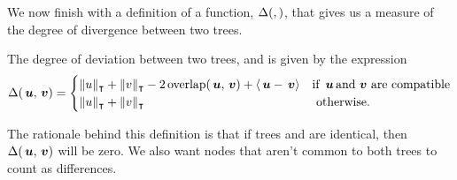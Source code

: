 \begin{definition}



\end{definition}


We now finish with a definition of a function, $\Delta(,)$, that gives us a
measure of the degree of divergence between two trees.
\begin{definition}
  \label{defdeviation}
  The degree of deviation between two trees,  and  is given  by the expression
  \begin{equation}
    \Delta(\,\boldsymbol{u},\,\boldsymbol{v}) = \begin{cases}
      \lVert{u}\rVert_{\intercal} + \lVert{v}\rVert_{\intercal} - 2\operatorname{overlap}(\,\boldsymbol{u},\,\boldsymbol{v}) + \langle{\,\boldsymbol{u} - \,\boldsymbol{v}}\rangle&\text{if }\,\boldsymbol{u} \operatorname{\text{and}} \,\boldsymbol{v} \text{ are compatible} \\
      \lVert{u}\rVert_{\intercal} + \lVert{v}\rVert_{\intercal} & \text{ otherwise.}
    \end{cases}
  \end{equation}
  
  The rationale behind this definition is that if trees  and  are identical, then
  $\Delta(\,\boldsymbol{u},\,\boldsymbol{v})$ will be zero. We also want nodes that aren't common to both trees to
  count as differences.
\end{definition}

